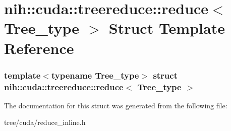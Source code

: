 \hypertarget{structnih_1_1cuda_1_1treereduce_1_1reduce}{
\section{nih\-:\-:cuda\-:\-:treereduce\-:\-:reduce$<$ \-Tree\-\_\-type $>$ \-Struct \-Template \-Reference}
\label{structnih_1_1cuda_1_1treereduce_1_1reduce}
}
\subsubsection*{template$<$typename Tree\-\_\-type$>$ struct nih\-::cuda\-::treereduce\-::reduce$<$ Tree\-\_\-type $>$}



\-The documentation for this struct was generated from the following file\-:\begin{DoxyCompactItemize}
\item 
tree/cuda/reduce\-\_\-inline.\-h\end{DoxyCompactItemize}
